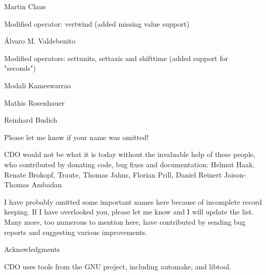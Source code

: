 Martin Claus

Modified operator: vertwind (added missing value support)

Álvaro M. Valdebenito

Modified operators:  settunits, settaxis and shifttime (added support for "seconds")

Modali Kameswarrao

Mathis Rosenhauer

Reinhard Budich

Please let me know if your name was omitted!

CDO would not be what it is today without the invaluable help of these people, who contributed by donating code, bug fixes and documentation:
Helmut Haak,
Renate Brokopf,
Traute, 
Thomas Jahns,
Florian Prill,
Daniel Reinert
Jaison-Thomas Ambadan

I have probably omitted some important names here because of incomplete record keeping. If I have overlooked you, please let me know and I will update the list. Many more, too numerous to mention here, have contributed by sending bug reports and suggesting various improvements.


Acknowledgments

CDO uses tools from the GNU project, including automake, and libtool. 
